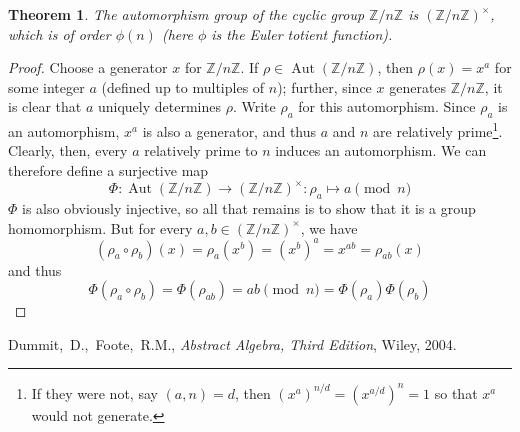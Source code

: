 \documentclass[12pt]{article}
\newcommand{\Ints}{\mathbb{Z}}
\DeclareMathOperator{\Aut}{Aut}
\newcommand{\UI}[1]{(\Ints/{#1}\Ints)^{\times}}
\newtheorem{thm}{Theorem}
\begin{document}
\begin{thm} The automorphism group of the cyclic group $\Ints/n\Ints$ is $\UI{n}$, which is of order $\phi(n)$ (here $\phi$ is the Euler totient function).
\end{thm}
\begin{proof} Choose a generator $x$ for $\Ints/n\Ints$. If $\rho\in \Aut(\Ints/n\Ints)$, then $\rho(x) = x^a$ for some integer $a$ (defined up to multiples of $n$); further, since $x$ generates $\Ints/n\Ints$, it is clear that $a$ uniquely determines $\rho$. Write $\rho_a$ for this automorphism. Since $\rho_a$ is an automorphism, $x^a$ is also a generator, and thus $a$ and $n$ are relatively prime\footnote{
If they were not, say $(a,n)=d$, then $(x^a)^{n/d} = (x^{a/d})^n=1$ so that $x^a$ would not generate.}. Clearly, then, every $a$ relatively prime to $n$ induces an automorphism. We can therefore define a surjective map
\[
  \Phi : \Aut(\Ints/n\Ints) \to \UI{n}: \rho_a\mapsto a\pmod n
\]
$\Phi$ is also obviously injective, so all that remains is to show that it is a group homomorphism. But for every $a,b\in\UI{n}$, we have
\[
  (\rho_a\circ\rho_b)(x) = \rho_a(x^b) = (x^b)^a = x^{ab} = \rho_{ab}(x)
\]
and thus
\[
  \Phi(\rho_a\circ\rho_b) = \Phi(\rho_{ab}) = ab\pmod n = \Phi(\rho_a)\Phi(\rho_b)
\]
\end{proof}
\begin{thebibliography}{10}
Dummit,~D.,~Foote,~R.M., \emph{Abstract Algebra, Third Edition}, Wiley, 2004.
\end{thebibliography}
\end{document}
